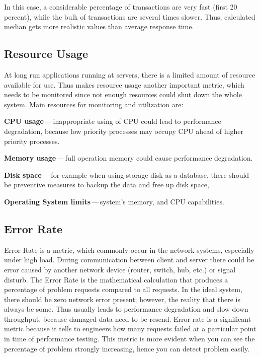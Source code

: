 In this case, a considerable percentage of transactions are very fast (first 20 percent), while the bulk of transactions are several times slower. Thus, calculated median gets more realistic values than average response time.

\subsection{Resource Usage}
At long run applications running at servers, there is a limited amount of resource available for use. Thus makes resource usage another important metric, which needs to be monitored since not enough resources could shut down the whole system. Main resources for monitoring and utilization are:

\begin{description}
	\setlength\itemsep{0em}
	\item \textbf{CPU usage}\,---\,inappropriate using of CPU could lead to performance degradation, because low priority processes may occupy CPU ahead of higher priority processes.
	\item \textbf{Memory usage}\,---\,full operation memory could cause performance degradation.
	\item \textbf{Disk space}\,---\,for example when using storage disk as a database, there should be preventive measures to backup the data and free up disk space,
	\item \textbf{Operating System limits}\,---\,system's memory, and CPU capabilities. 
\end{description}


\subsection{Error Rate}
Error Rate is a metric, which commonly occur in the network systems, especially under high load. During communication between client and server there could be error caused by another network device (router, switch, hub, etc.) or signal disturb. The Error Rate is the mathematical calculation that produces a percentage of problem requests compared to all requests. In the ideal system, there should be zero network error present; however, the reality that there is always be some. Thus usually leads to performance degradation and slow down throughput, because damaged data need to be resend.
Error rate is a significant metric because it tells to engineers how many requests failed at a particular point in time of performance testing. This metric is more evident when you can see the percentage of problem strongly increasing, hence you can detect problem easily.

